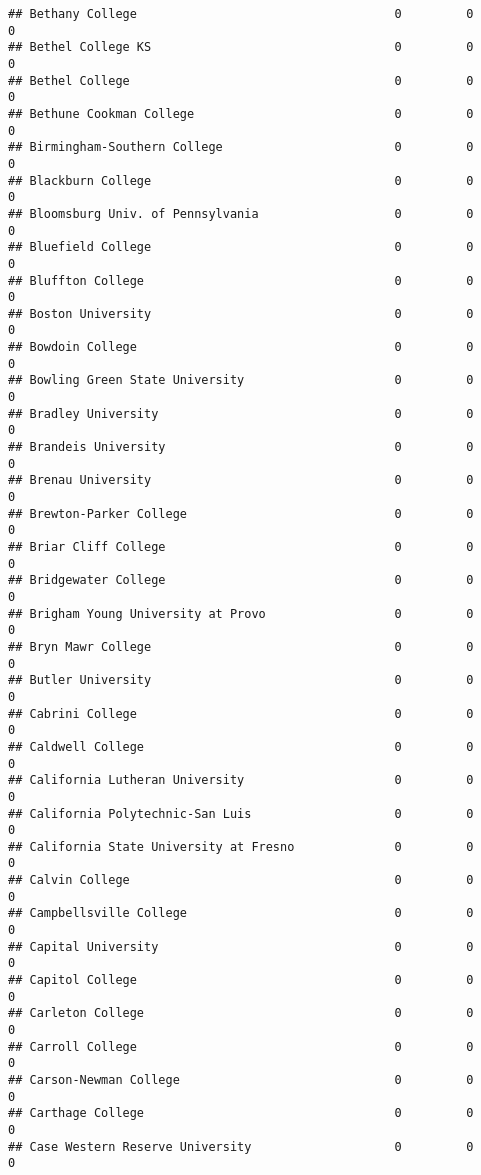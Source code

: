 \documentclass[
]{article}
\begin{document}
\begin{verbatim}
## Bethany College                                    0         0         0
## Bethel College KS                                  0         0         0
## Bethel College                                     0         0         0
## Bethune Cookman College                            0         0         0
## Birmingham-Southern College                        0         0         0
## Blackburn College                                  0         0         0
## Bloomsburg Univ. of Pennsylvania                   0         0         0
## Bluefield College                                  0         0         0
## Bluffton College                                   0         0         0
## Boston University                                  0         0         0
## Bowdoin College                                    0         0         0
## Bowling Green State University                     0         0         0
## Bradley University                                 0         0         0
## Brandeis University                                0         0         0
## Brenau University                                  0         0         0
## Brewton-Parker College                             0         0         0
## Briar Cliff College                                0         0         0
## Bridgewater College                                0         0         0
## Brigham Young University at Provo                  0         0         0
## Bryn Mawr College                                  0         0         0
## Butler University                                  0         0         0
## Cabrini College                                    0         0         0
## Caldwell College                                   0         0         0
## California Lutheran University                     0         0         0
## California Polytechnic-San Luis                    0         0         0
## California State University at Fresno              0         0         0
## Calvin College                                     0         0         0
## Campbellsville College                             0         0         0
## Capital University                                 0         0         0
## Capitol College                                    0         0         0
## Carleton College                                   0         0         0
## Carroll College                                    0         0         0
## Carson-Newman College                              0         0         0
## Carthage College                                   0         0         0
## Case Western Reserve University                    0         0         0

\end{verbatim}
\end{document}
